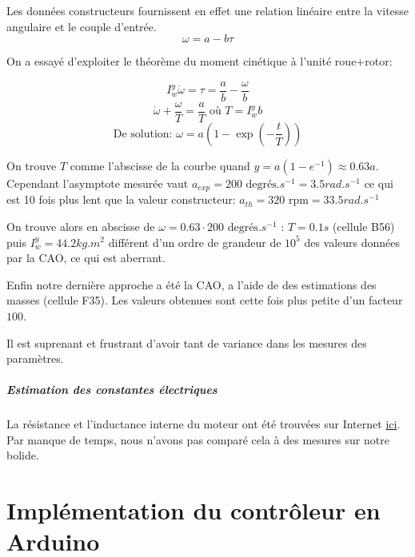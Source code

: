 \documentclass{report}
\begin{document}
Les données constructeurs fournissent en effet une relation 
linéaire entre la vitesse angulaire et le couple d'entrée. $$\omega = a - b\tau$$

On a essayé d'exploiter le théorème du moment cinétique à l'unité roue+rotor:

$$I_w^y\dot{\omega} = \tau = \frac{a}{b} - \frac{\omega}{b}$$
$$\dot{\omega} +  \frac{\omega}{T} = \frac{a}{T} \text{  où  } T=I_w^yb$$
$$\text{De solution: } \omega = a\left(1 - \exp\left(-\frac{t}{T}\right) \right)$$

On trouve $T$ comme l'abscisse de la courbe quand $y=a\left(1 - e^{-1}\right) \approx 0.63a$. 
Cependant l'asymptote mesurée vaut $a_{exp} = 200 \text{ degrés}.s^{-1} = 3.5 rad.s^{-1}$ 
ce qui est 10 fois plus lent que la valeur constructeur: $a_{th} = 320 \text{ rpm} = 33.5 rad.s^{-1}$

On trouve alors en abscisse de $\omega = 0.63\cdot200 \text{ degrés}.s^{-1}$ : $T=0.1s$ (cellule B56) 
puis $I_w^y = 44.2 kg.m^2$ différent d'un ordre de grandeur de $10^5$ des valeurs données par la CAO,
ce qui est aberrant.

Enfin notre dernière approche a été la CAO, a l'aide de des estimations des masses (cellule F35).
Les valeurs obtenues sont cette fois plus petite d'un facteur $100$.

Il est suprenant et frustrant d'avoir tant de variance dans les mesures des paramètres.


\paragraph{Estimation des constantes électriques}
La résistance et l'inductance interne du moteur ont été trouvées sur Internet 
\href{https://forum.pololu.com/t/mechanics-and-electrical-parameters/18153/2}{ici}.
Par manque de temps, nous n'avons pas comparé cela à des mesures sur notre bolide.

\chapter{Implémentation du contrôleur en Arduino}

\end{document}
